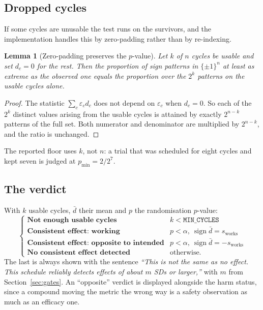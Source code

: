 \documentclass{article}
\theoremstyle{plain}
\newtheorem{lemma}[theorem]{Lemma}
\theoremstyle{definition}
\theoremstyle{remark}
\numberwithin{equation}{section}
\begin{document}
\subsection{Dropped cycles}

If some cycles are unusable the test runs on the survivors, and the
implementation handles this by zero-padding rather than by re-indexing.

\begin{lemma}[Zero-padding preserves the $p$-value]
\label{lem:pad}
Let $k$ of $n$ cycles be usable and set $d_c = 0$ for the rest. Then the
proportion of sign patterns in $\{\pm1\}^n$ at least as extreme as the observed
one equals the proportion over the $2^k$ patterns on the usable cycles alone.
\end{lemma}

\begin{proof}
The statistic $\sum_c \varepsilon_c d_c$ does not depend on $\varepsilon_c$
when $d_c = 0$. So each of the $2^k$ distinct values arising from the usable
cycles is attained by exactly $2^{n-k}$ patterns of the full set. Both
numerator and denominator are multiplied by $2^{n-k}$, and the ratio is
unchanged.
\end{proof}

The reported floor uses $k$, not $n$: a trial that was scheduled for eight
cycles and kept seven is judged at $p_{\min} = 2/2^7$.

\subsection{The verdict}

With $k$ usable cycles, $\bar d$ their mean and $p$ the randomisation
$p$-value:
\[
  \begin{cases}
    \textbf{Not enough usable cycles} & k < \texttt{MIN\_CYCLES} \\
    \textbf{Consistent effect: working} & p < \alpha,\ \operatorname{sign}\bar d = s_{\mathrm{works}} \\
    \textbf{Consistent effect: opposite to intended} & p < \alpha,\ \operatorname{sign}\bar d = -s_{\mathrm{works}} \\
    \textbf{No consistent effect detected} & \text{otherwise.}
  \end{cases}
\]
The last is always shown with the sentence \emph{``This is not the same as no
effect. This schedule reliably detects effects of about $m$ SDs or larger,''}
with $m$ from Section~\ref{sec:gates}. An ``opposite'' verdict is displayed
alongside the harm status, since a compound moving the metric the wrong way is
a safety observation as much as an efficacy one.
\end{document}
